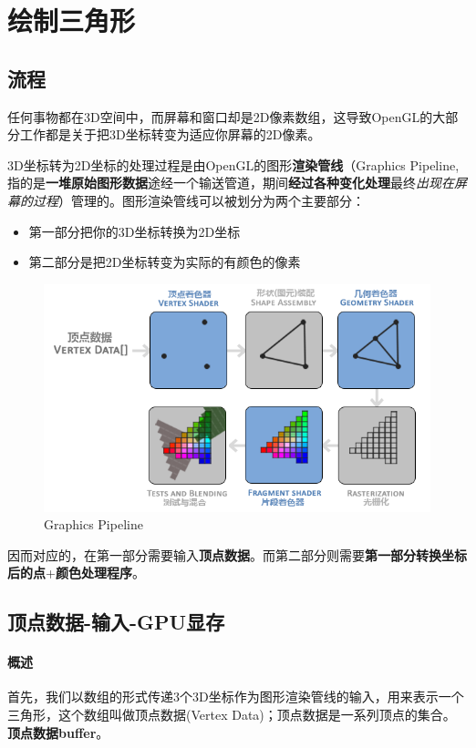 \documentclass[UTF8,a4paper,12pt]{ctexbook}
\begin{document}
				
	\section{绘制三角形}
	
		\subsection{流程}
			任何事物都在3D空间中，而屏幕和窗口却是2D像素数组，这导致OpenGL的大部分工作都是关于把3D坐标转变为适应你屏幕的2D像素。
			
			3D坐标转为2D坐标的处理过程是由OpenGL的图形\textbf{渲染管线}（Graphics Pipeline,指的是\textbf{一堆原始图形数据}途经一个输送管道，期间\textbf{经过各种变化处理}最终\textit{出现在屏幕的过程}）管理的。图形渲染管线可以被划分为两个主要部分：
				\begin{itemize}[itemindent = 1em]
					\item 第一部分把你的3D坐标转换为2D坐标
					\item 第二部分是把2D坐标转变为实际的有颜色的像素
				\end{itemize}
			
			\begin{figure}[H]
				\centering
				\includegraphics[width=.93\linewidth]{PipelineBase}
				\caption{Graphics Pipeline}
			\end{figure}

			
			因而对应的，在第一部分需要输入\textbf{顶点数据}。而第二部分则需要\textbf{第一部分转换坐标后的点}+\textbf{颜色处理程序}。
			
		
		\subsection{顶点数据-输入-GPU显存}
			
			\paragraph{概述}
				首先，我们以数组的形式传递3个3D坐标作为图形渲染管线的输入，用来表示一个三角形，这个数组叫做顶点数据(Vertex Data)；顶点数据是一系列顶点的集合。
				\textbf{顶点数据buffer}。
				
\end{document}
